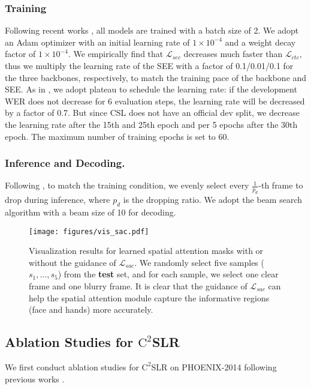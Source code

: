 \documentclass[acmsmall,screen]{acmart}
\def \tbf{\textbf}
\begin{document}
\subsubsection{Training}
Following recent works \cite{self-mutual, vac, stmc}, all models are trained with a batch size of 2.
We adopt an Adam optimizer \cite{adam} with an initial learning rate of $1\times 10^{-4}$ and a weight decay factor of $1\times 10^{-4}$.
We empirically find that $\mathcal{L}_{sec}$ decreases much faster than $\mathcal{L}_{ctc}$, thus we multiply the learning rate of the SEE with a factor of 0.1/0.01/0.1 for the three backbones, respectively, to match the training pace of the backbone and SEE.
As in \cite{slt}, we adopt plateau to schedule the learning rate: if the development WER does not decrease for 6 evaluation steps, the learning rate will be decreased by a factor of 0.7.
But since CSL does not have an official dev split, we decrease the learning rate after the 15th and 25th epoch and per 5 epochs after the 30th epoch.
The maximum number of training epochs is set to 60.

\subsubsection{Inference and Decoding.}
Following \cite{sfl}, to match the training condition, we evenly select every $\frac{1}{p_d}$-th frame to drop during inference, where $p_d$ is the dropping ratio.
We adopt the beam search algorithm with a beam size of 10 for decoding.
















\begin{figure*}[t]
  \centering
   \texttt{[image: figures/vis\_sac.pdf]}
   \caption{Visualization results for learned spatial attention masks with or without the guidance of $\mathcal{L}_{sac}$. We randomly select five samples ($s_1, \dots, s_5$) from the \tbf{test} set, and for each sample, we select one clear frame and one blurry frame. It is clear that the guidance of $\mathcal{L}_{sac}$ can help the spatial attention module capture the informative regions (face and hands) more accurately.}
   \label{fig:vis_sac}
\end{figure*}

\subsection{Ablation Studies for $\text{C}^2$SLR}
We first conduct ablation studies for $\text{C}^2$SLR on PHOENIX-2014 following previous works \cite{vac, stmc, cma, self-mutual}.
\end{document}
